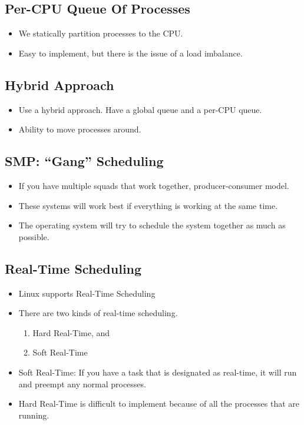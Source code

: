 \documentclass[]{article}
\begin{document}
\subsection{Per-CPU Queue Of Processes}
\begin{itemize}
\item We statically partition processes to the CPU.
\item Easy to implement, but there is the issue of a load imbalance.
\end{itemize}

\subsection{Hybrid Approach}
\begin{itemize}
\item Use a hybrid approach. Have a global queue and a per-CPU queue.
\item Ability to move processes around.
\end{itemize}

\subsection{SMP: ``Gang'' Scheduling}
\begin{itemize}
\item If you have multiple squads that work together, producer-consumer model.
\item These systems will work best if everything is working at the same time.
\item The operating system will try to schedule the system together as much as possible.
\end{itemize}

\subsection{Real-Time Scheduling}
\begin{itemize}
\item Linux supports Real-Time Scheduling
\item There are two kinds of real-time scheduling.
\begin{enumerate}
\item Hard Real-Time, and
\item Soft Real-Time
\end{enumerate}
\item Soft Real-Time: If you have a task that is designated as real-time, it will run and preempt any normal processes.
\item Hard Real-Time is difficult to implement because of all the processes that are running.
\end{itemize}
\end{document}

